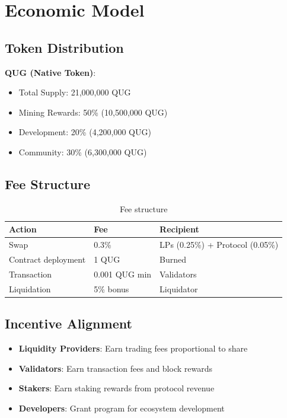 \documentclass[11pt,a4paper]{article}
\begin{document}
\section{Economic Model}

\subsection{Token Distribution}

\textbf{QUG (Native Token)}:
\begin{itemize}[leftmargin=*]
    \item Total Supply: 21,000,000 QUG
    \item Mining Rewards: 50\% (10,500,000 QUG)
    \item Development: 20\% (4,200,000 QUG)
    \item Community: 30\% (6,300,000 QUG)
\end{itemize}

\subsection{Fee Structure}

\begin{table}[H]
\centering
\begin{tabular}{llp{5cm}}
\toprule
\textbf{Action} & \textbf{Fee} & \textbf{Recipient} \\
\midrule
Swap & 0.3\% & LPs (0.25\%) + Protocol (0.05\%) \\
Contract deployment & 1 QUG & Burned \\
Transaction & 0.001 QUG min & Validators \\
Liquidation & 5\% bonus & Liquidator \\
\bottomrule
\end{tabular}
\caption{Fee structure}
\end{table}

\subsection{Incentive Alignment}

\begin{itemize}[leftmargin=*]
    \item \textbf{Liquidity Providers}: Earn trading fees proportional to share
    \item \textbf{Validators}: Earn transaction fees and block rewards
    \item \textbf{Stakers}: Earn staking rewards from protocol revenue
    \item \textbf{Developers}: Grant program for ecosystem development
\end{itemize}
\end{document}
